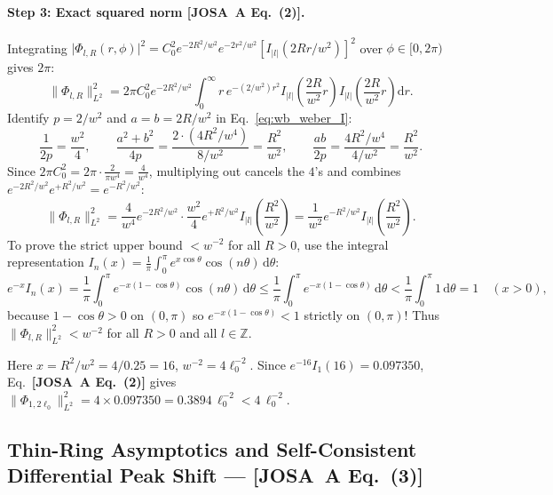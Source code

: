 \documentclass[10pt,letterpaper]{article}
\newcommand{\norm}[1]{\lVert #1 \rVert}
\newcommand{\abs}[1]{\lvert #1 \rvert}
\newcommand{\dd}{\mathrm{d}}
\newcommand{\josa}[1]{\textbf{[JOSA~A Eq.~(#1)]}}
\numberwithin{equation}{section}
\begin{document}
\paragraph*{Step 3: Exact squared norm \josa{2}.}
Integrating $\abs{\Phi_{l,R}(r,\phi)}^2 = C_0^2 e^{-2R^2/w^2} e^{-2r^2/w^2}[I_{\abs{l}}(2Rr/w^2)]^2$ over $\phi \in [0,2\pi)$ gives $2\pi$:
\begin{equation}
  \norm{\Phi_{l,R}}_{L^2}^2 = 2\pi C_0^2 e^{-2R^2/w^2} \int_0^\infty r\,e^{-(2/w^2)r^2} I_{\abs{l}}\!\left(\frac{2R}{w^2}r\right) I_{\abs{l}}\!\left(\frac{2R}{w^2}r\right)\dd r.
\end{equation}
Identify $p = 2/w^2$ and $a = b = 2R/w^2$ in Eq.~\eqref{eq:wb_weber_I}:
\begin{equation}
  \frac{1}{2p} = \frac{w^2}{4}, \qquad \frac{a^2+b^2}{4p} = \frac{2\cdot(4R^2/w^4)}{8/w^2} = \frac{R^2}{w^2}, \qquad \frac{ab}{2p} = \frac{4R^2/w^4}{4/w^2} = \frac{R^2}{w^2}.
\end{equation}
Since $2\pi C_0^2 = 2\pi\cdot\frac{2}{\pi w^4} = \frac{4}{w^4}$, multiplying out cancels the $4$'s and combines $e^{-2R^2/w^2} e^{+R^2/w^2} = e^{-R^2/w^2}$:
\begin{equation}
  \norm{\Phi_{l,R}}_{L^2}^2 = \frac{4}{w^4} e^{-2R^2/w^2} \cdot \frac{w^2}{4} e^{+R^2/w^2} I_{\abs{l}}\!\left(\frac{R^2}{w^2}\right) = \frac{1}{w^2} e^{-R^2/w^2} I_{\abs{l}}\!\left(\frac{R^2}{w^2}\right).
\end{equation}
To prove the strict upper bound $< w^{-2}$ for all $R > 0$, use the integral representation $I_n(x) = \frac{1}{\pi}\int_0^\pi e^{x\cos\theta}\cos(n\theta)\,\dd\theta$:
\begin{equation}
  e^{-x} I_n(x) = \frac{1}{\pi}\int_0^\pi e^{-x(1-\cos\theta)}\cos(n\theta)\,\dd\theta \le \frac{1}{\pi}\int_0^\pi e^{-x(1-\cos\theta)}\,\dd\theta < \frac{1}{\pi}\int_0^\pi 1\,\dd\theta = 1\quad (x > 0),
\end{equation}
because $1 - \cos\theta > 0$ on $(0,\pi)$ so $e^{-x(1-\cos\theta)} < 1$ strictly on $(0,\pi)$! Thus $\norm{\Phi_{l,R}}_{L^2}^2 < w^{-2}$ for all $R > 0$ and all $l \in \mathbb{Z}$.

\begin{pencheck}[Hand Check at $R = 2\ell_0$, $w = 0.5\ell_0$, $l = 1$]
Here $x = R^2/w^2 = 4/0.25 = 16$, $w^{-2} = 4\ell_0^{-2}$. Since $e^{-16} I_1(16) = 0.097350$, Eq.~\josa{2} gives $\norm{\Phi_{1,2\ell_0}}_{L^2}^2 = 4\times 0.097350 = 0.3894\,\ell_0^{-2} < 4\,\ell_0^{-2}$.
\end{pencheck}

\subsection{Thin-Ring Asymptotics and Self-Consistent Differential Peak Shift --- \josa{3}}
\label{sec:s2_peak}
\end{document}
